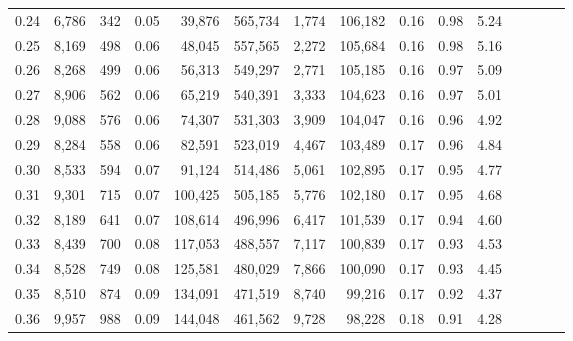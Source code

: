 \begin{tabular}{rrrcrrrrrrrrrrr}
0.24 &   6,786 &    342 &                                       0.05 &   39,876 &  565,734 &    1,774 &  106,182 &  0.16 &  0.98 &                         5.24 \\
0.25 &   8,169 &    498 &                                       0.06 &   48,045 &  557,565 &    2,272 &  105,684 &  0.16 &  0.98 &                         5.16 \\
0.26 &   8,268 &    499 &                                       0.06 &   56,313 &  549,297 &    2,771 &  105,185 &  0.16 &  0.97 &                         5.09 \\
0.27 &   8,906 &    562 &                                       0.06 &   65,219 &  540,391 &    3,333 &  104,623 &  0.16 &  0.97 &                         5.01 \\
0.28 &   9,088 &    576 &                                       0.06 &   74,307 &  531,303 &    3,909 &  104,047 &  0.16 &  0.96 &                         4.92 \\
0.29 &   8,284 &    558 &                                       0.06 &   82,591 &  523,019 &    4,467 &  103,489 &  0.17 &  0.96 &                         4.84 \\
0.30 &   8,533 &    594 &                                       0.07 &   91,124 &  514,486 &    5,061 &  102,895 &  0.17 &  0.95 &                         4.77 \\
0.31 &   9,301 &    715 &                                       0.07 &  100,425 &  505,185 &    5,776 &  102,180 &  0.17 &  0.95 &                         4.68 \\
0.32 &   8,189 &    641 &                                       0.07 &  108,614 &  496,996 &    6,417 &  101,539 &  0.17 &  0.94 &                         4.60 \\
0.33 &   8,439 &    700 &                                       0.08 &  117,053 &  488,557 &    7,117 &  100,839 &  0.17 &  0.93 &                         4.53 \\
0.34 &   8,528 &    749 &                                       0.08 &  125,581 &  480,029 &    7,866 &  100,090 &  0.17 &  0.93 &                         4.45 \\
0.35 &   8,510 &    874 &                                       0.09 &  134,091 &  471,519 &    8,740 &   99,216 &  0.17 &  0.92 &                         4.37 \\
0.36 &   9,957 &    988 &                                       0.09 &  144,048 &  461,562 &    9,728 &   98,228 &  0.18 &  0.91 &                         4.28 \\

\end{tabular}
